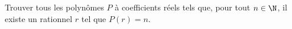 Trouver tous les polynômes $P$ à coefficients réels tels que, pour tout $n \in \N$, il existe un rationnel $r$ tel que $P(r)=n$.